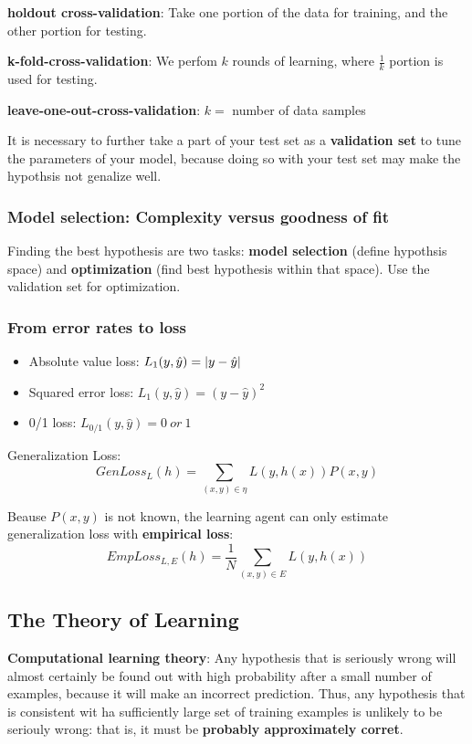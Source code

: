\documentclass{scrartcl}
\DeclarePairedDelimiter\abs{\lvert}{\rvert}%
\begin{document}
\textbf{holdout cross-validation}: Take one portion of the data for training, and the other portion for testing.

\textbf{k-fold-cross-validation}: We perfom \(k\) rounds of learning, where \(\frac{1}{k}\) portion is used for testing.

\textbf{leave-one-out-cross-validation}: \(k=\) number of data samples

It is necessary to further take a part of your test set as a \textbf{validation set} to tune the parameters of your model, because doing so with your test set may make the hypothsis not genalize well.

\subsubsection{Model selection: Complexity versus goodness of fit}
Finding the best hypothesis are two tasks: \textbf{model selection} (define hypothsis space) and \textbf{optimization} (find best hypothesis within that space). Use the validation set for optimization.

\subsubsection{From error rates to loss}
\begin{itemize}
    \item
        Absolute value loss:  \(L_1(y, \hat{y}) = \abs{y - \hat{y}}\) 
    \item
        Squared error loss:  \(L_1(y, \hat{y}) = (y - \hat{y})^2\) 
    \item
        0/1 loss: \(L_{0/1}(y, \hat{y}) = 0  \ or \ 1\)
\end{itemize}

Generalization Loss:
\[GenLoss_L(h) = \sum_{(x,y) \in \eta} L(y, h(x)) P(x,y)\]

Beause \(P(x,y)\) is not known, the learning agent can only estimate generalization loss with \textbf{empirical loss}:
\[EmpLoss_{L,E} (h) = \frac{1}{N} \sum_{(x,y) \in E} L(y, h(x))\]

\subsection{The Theory of Learning}
\textbf{Computational learning theory}: Any hypothesis that is seriously wrong will almost certainly be found out with high probability after a small number of examples, because it will make an incorrect prediction. Thus, any hypothesis that is consistent wit ha sufficiently large set of training examples is unlikely to be seriouly wrong: that is, it must be \textbf{probably approximately corret}.
\end{document}
